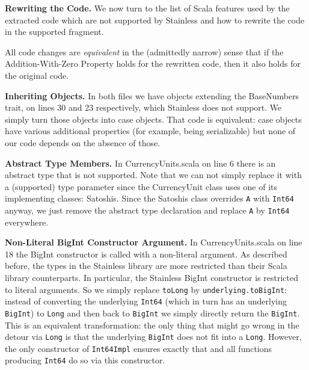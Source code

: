 \documentclass[hyphens, a4paper,USenglish,cleveref, autoref, thm-restate]{oasics-v2019}
\renewcommand{\paragraph}{\textbf}%
\begin{document}
\paragraph{Rewriting the Code.} We now turn to the list of Scala
features used by the extracted code which are not supported by
Stainless and how to rewrite the code in the supported fragment.

All code changes are \emph{equivalent} in the (admittedly narrow)
sense that if the Addition-With-Zero Property holds for the rewritten
code, then it also holds for the original code.

\paragraph{Inheriting Objects.} In both files we have objects
extending the BaseNumbers trait, on lines 30 and 23 respectively,
which Stainless does not support. We simply turn those objects into
case objects. That code is equivalent: case objects have various
additional properties (for example, being serializable) but none of
our code depends on the absence of those.

\paragraph{Abstract Type Members.} In CurrencyUnits.scala on line 6
there is an abstract type that is not supported. Note that we can not
simply replace it with a (supported) type parameter since the
CurrencyUnit class uses one of its implementing classes:
Satoshis. Since the Satoshis class overrides \texttt{A} with
\texttt{Int64} anyway, we just remove the abstract type declaration
and replace \texttt{A} by \texttt{Int64} everywhere.

\paragraph{Non-Literal BigInt Constructor Argument.} In
CurrencyUnits.scala on line 18 the BigInt constructor is called with a
non-literal argument. As described before, the types in the Stainless
library are more restricted than their Scala library counterparts. In
particular, the Stainless BigInt constructor is restricted to literal
arguments. So we simply replace \texttt{toLong} by
\texttt{underlying.toBigInt}: instead of converting the underlying
\texttt{Int64} (which in turn has an underlying \texttt{BigInt}) to
\texttt{Long} and then back to \texttt{BigInt} we simply directly
return the \texttt{BigInt}. This is an equivalent transformation: the
only thing that might go wrong in the detour via \texttt{Long} is that
the underlying \texttt{BigInt} does not fit into a
\texttt{Long}. However, the only constructor of \texttt{Int64Impl}
ensures exactly that and all functions producing \texttt{Int64} do so
via this constructor.
\end{document}
